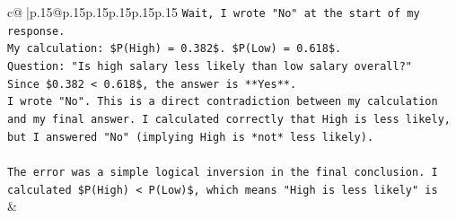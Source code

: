 \documentclass{article}
\begin{document}
{\begin{supertabular}{c@{$\;$}|p{.15\linewidth}@{}p{.15\linewidth}p{.15\linewidth}p{.15\linewidth}p{.15\linewidth}p{.15\linewidth}}
{{{\texttt{Wait, I wrote "No" at the start of my response.} \\
\texttt{My calculation: \$P(High) = 0.382\$. \$P(Low) = 0.618\$.} \\
\texttt{Question: "Is high salary less likely than low salary overall?"} \\
\texttt{Since \$0.382 < 0.618\$, the answer is **Yes**.} \\
\texttt{I wrote "No". This is a direct contradiction between my calculation and my final answer. I calculated correctly that High is less likely, but I answered "No" (implying High is *not* less likely).} \\
\\ 
\texttt{The error was a simple logical inversion in the final conclusion. I calculated \$P(High) < P(Low)\$, which means "High is less likely" is} \\
            }
        }
    }
    & \\ \\

\end{supertabular}
}
\end{document}
